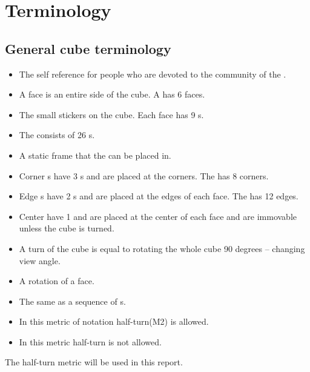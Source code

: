 \chapter{Terminology}
\section{General cube terminology}
\label{sec:generalNotation}
\begin{itemize}
\item {}The self reference for people who are devoted to the community of the \rubik{}. 
\item {}A face is an entire side of the cube. A \rubik{} has 6 faces.
\item {}The small stickers on the cube. Each face has 9 \facet{}s.
\item {} The \rubik{} consists of 26 \cpiece{}s.
\item {} A static frame that the \cpiece{} can be placed in.
\item {}Corner \cpiece{}s have 3 \facet{}s and are placed at the corners. The \rubik{} has 8 corners. 
\item {}Edge \cpiece{}s have 2 \facet{}s and are placed at the edges of each face. The \rubik{} has 12 edges.
\item {}Center \cpiece{} have 1 \facet{} and are placed at the center of each face and are immovable unless the cube is turned. 
\item {}A turn of the cube is equal to rotating the whole cube 90 degrees -- changing view angle.
\item {}A rotation of a face.%
\item {}The same as a sequence of \twist{}s.
\item {}In this metric of notation half-turn(M2) is allowed. 
\item {}In this metric half-turn is not allowed.
\end{itemize}
The half-turn metric will be used in this report. 


